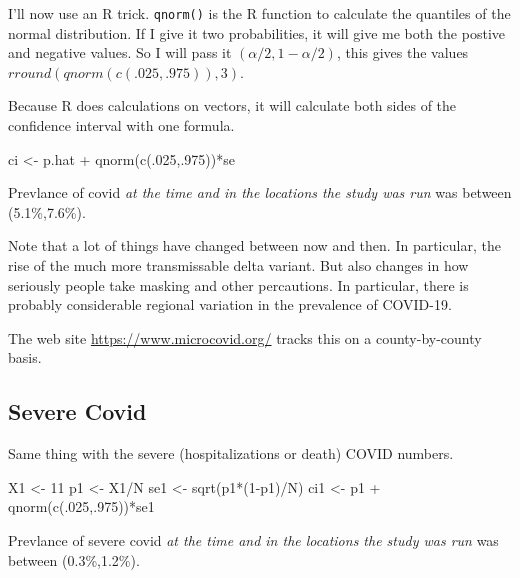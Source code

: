 \documentclass[
]{article}
\newenvironment{Shaded}{\begin{snugshade}}{\end{snugshade}}
\newcommand{\DecValTok}[1]{\textcolor[rgb]{0.00,0.00,0.81}{#1}}
\newcommand{\FunctionTok}[1]{\textcolor[rgb]{0.00,0.00,0.00}{#1}}
\newcommand{\NormalTok}[1]{#1}
\newcommand{\OtherTok}[1]{\textcolor[rgb]{0.56,0.35,0.01}{#1}}
\newcommand{\SpecialCharTok}[1]{\textcolor[rgb]{0.00,0.00,0.00}{#1}}
\begin{document}
I'll now use an R trick. \texttt{qnorm()} is the R function to calculate
the quantiles of the normal distribution. If I give it two
probabilities, it will give me both the postive and negative values. So
I will pass it \((\alpha/2,1-\alpha/2)\), this gives the values
\(r round(qnorm(c(.025,.975)),3)\).

Because R does calculations on vectors, it will calculate both sides of
the confidence interval with one formula.

\begin{Shaded}
\begin{Highlighting}[]
\NormalTok{ci }\OtherTok{\textless{}{-}}\NormalTok{ p.hat }\SpecialCharTok{+} \FunctionTok{qnorm}\NormalTok{(}\FunctionTok{c}\NormalTok{(.}\DecValTok{025}\NormalTok{,.}\DecValTok{975}\NormalTok{))}\SpecialCharTok{*}\NormalTok{se}
\end{Highlighting}
\end{Shaded}

Prevlance of covid \emph{at the time and in the locations the study was
run} was between (5.1\%,7.6\%).

Note that a lot of things have changed between now and then. In
particular, the rise of the much more transmissable delta variant. But
also changes in how seriously people take masking and other percautions.
In particular, there is probably considerable regional variation in the
prevalence of COVID-19.

The web site \url{https://www.microcovid.org/} tracks this on a
county-by-county basis.

\hypertarget{severe-covid}{%
\subsection{Severe Covid}\label{severe-covid}}

Same thing with the severe (hospitalizations or death) COVID numbers.

\begin{Shaded}
\begin{Highlighting}[]
\NormalTok{X1 }\OtherTok{\textless{}{-}} \DecValTok{11}
\NormalTok{p1 }\OtherTok{\textless{}{-}}\NormalTok{ X1}\SpecialCharTok{/}\NormalTok{N}
\NormalTok{se1 }\OtherTok{\textless{}{-}} \FunctionTok{sqrt}\NormalTok{(p1}\SpecialCharTok{*}\NormalTok{(}\DecValTok{1}\SpecialCharTok{{-}}\NormalTok{p1)}\SpecialCharTok{/}\NormalTok{N)}
\NormalTok{ci1 }\OtherTok{\textless{}{-}}\NormalTok{ p1 }\SpecialCharTok{+} \FunctionTok{qnorm}\NormalTok{(}\FunctionTok{c}\NormalTok{(.}\DecValTok{025}\NormalTok{,.}\DecValTok{975}\NormalTok{))}\SpecialCharTok{*}\NormalTok{se1}
\end{Highlighting}
\end{Shaded}

Prevlance of severe covid \emph{at the time and in the locations the
study was run} was between (0.3\%,1.2\%).
\end{document}
